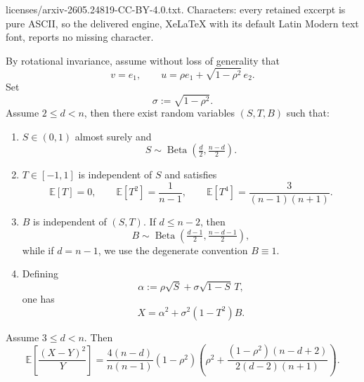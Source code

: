 \documentclass[10pt,a4paper]{amsart}
\DeclareMathOperator{\BetaDist}{Beta}
\begin{document}
licenses/arxiv-2605.24819-CC-BY-4.0.txt. Characters: every retained excerpt is pure ASCII, so the delivered engine, XeLaTeX with its default Latin Modern text font, reports no missing character.
\begin{lemma}
\label{lem:cond_decomp}
By rotational invariance, assume without loss of generality that
\begin{equation}
v=e_1,
\qquad
u=\rho e_1+\sqrt{1-\rho^2}\,e_2.
\label{eq:wlog_basis}
\end{equation}
Set
\[
\sigma:=\sqrt{1-\rho^2}.
\]
Assume \(2\le d<n\), then there exist random variables $(S,T,B)$ such that:
\begin{enumerate}
\item $S\in(0,1)$ almost surely and
\begin{equation}
S\sim \BetaDist\!\left(\tfrac d2,\tfrac{n-d}{2}\right).
\label{eq:S_beta}
\end{equation}
\item $T\in[-1,1]$ is independent of $S$ and satisfies
\begin{equation}
\mathbb E[T]=0,
\qquad
\mathbb E[T^2]=\frac{1}{n-1},
\qquad
\mathbb E[T^4]=\frac{3}{(n-1)(n+1)}.
\label{eq:T_moments}
\end{equation}
\item \(B\) is independent of \((S,T)\). If \(d\le n-2\), then
\[
B\sim \BetaDist\!\left(\tfrac{d-1}{2},\tfrac{n-d-1}{2}\right),
\]
while if \(d=n-1\), we use the degenerate convention \(B\equiv1\).
\item Defining
\begin{equation}
\alpha:=\rho\sqrt S+\sigma\sqrt{1-S}\,T,
\label{eq:def_alpha}
\end{equation}
one has
\begin{equation}
X=\alpha^2+\sigma^2(1-T^2)B.
\label{eq:X_decomp}
\end{equation}
\end{enumerate}
\end{lemma}

\begin{proposition}
\label{prop:exact_Delta2_over_Y}
Assume \(3\le d<n\). Then
\[
\mathbb E\!\left[\frac{(X-Y)^2}{Y}\right]
=
\frac{4(n-d)}{n(n-1)}(1-\rho^2)
\left(
\rho^2+
\frac{(1-\rho^2)(n-d+2)}{2(d-2)(n+1)}
\right).
\]
\end{proposition}
\end{document}

